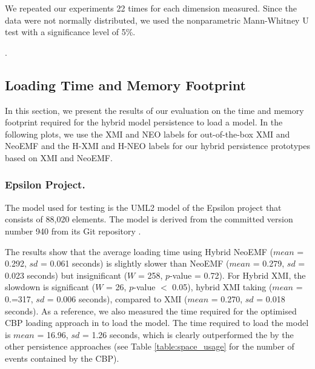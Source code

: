 \documentclass{llncs}
\begin{document}
We repeated our experiments 22 times for each dimension measured. Since the data were not normally distributed, we used the nonparametric Mann-Whitney U test \cite{doi:10.1002/9780470479216.corpsy0524} with a significance level of 5\%.

. %


\subsection{Loading Time and Memory Footprint}
\label{sec:model_loading_time}
In this section, we present the results of our evaluation on the time and memory footprint required for the hybrid model persistence to load a model. In the following plots, we use the XMI and NEO labels for out-of-the-box XMI and NeoEMF and the H-XMI and H-NEO labels for our hybrid persistence prototypes based on XMI and NeoEMF.

\subsubsection{Epsilon Project.}
\label{sec:model_loading_time_epsilon}
The model used for testing is the UML2 model of the Epsilon project that consists of 88,020 elements. The model is derived from the committed version number 940 from its Git repository \cite{eclipse2018epsilongit}. 

The results show that the average loading time using Hybrid NeoEMF ($mean$ = 0.292, $sd$ = 0.061 seconds) is slightly slower than NeoEMF ($mean$ = 0.279, $sd$ = 0.023 seconds) but insignificant ($W$ = 258, $p$-value = 0.72). For Hybrid XMI, the slowdown is significant ($W$ = 26, $p$-value $<$ 0.05), hybrid XMI taking ($mean$ = 0.=317, $sd$ = 0.006 seconds), compared to XMI ($mean$ = 0.270, $sd$ = 0.018 seconds). As a reference, we also measured the time required for the optimised CBP loading approach in \cite{yohannis2018towards} to load the model. The time required to load the model is $mean$ = 16.96, $sd$ = 1.26 seconds, which is clearly outperformed the by the other persistence approaches (see Table \ref{table:space_usage} for the number of events contained by the CBP).
\end{document}
